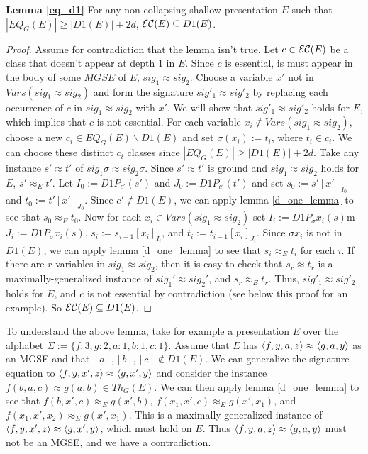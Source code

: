 \noindent \textbf{Lemma \ref{eq_d1}} For any non-collapsing shallow presentation $E$ such that $|EQ_G(E)| \ge |D1(E)| + 2d$, ${\mathcal{E}\mathcal{C}}(E) \subseteq D1(E)$.
\begin{proof}
Assume for contradiction that the lemma isn't true. 
Let $c \in {\mathcal{E}\mathcal{C}}(E)$ be a class that doesn't appear at depth 1 in $E$.
Since $c$ is essential, is must appear in the body of some $MGSE$ of $E$, $sig_1 \approx sig_2$.
Choose a variable $x'$ not in $Vars(sig_1 \approx sig_2)$ and form the signature $sig'_1 \approx sig'_2$ by replacing each occurrence of $c$ in $sig_1 \approx sig_2$ with $x'$.
We will show that $sig'_1 \approx sig'_2$ holds for $E$, which implies that $c$ is not essential.
For each variable $x_i \not \in Vars(sig_1\approx sig_2)$, choose a new $c_i \in EQ_G(E) \backslash D1(E)$ and set $\sigma(x_i) := t_i$, where $t_i \in c_i$.
We can choose these distinct $c_i$ classes since $|EQ_G(E)| \ge |D1(E)| + 2d$.
Take any instance $s' \approx t'$ of $sig_1\sigma\approx sig_2\sigma$.  
Since $s'\approx t'$ is ground and $sig_1 \approx sig_2$ holds for $E$, $s'\approx_E t'$.
Let $I_0 := D1P_{c'}(s')$ and $J_0 := D1P_{c'}(t')$ and set $s_0 := s'[x']_{I_0}$ and $t_0 := t'[x']_{J_0}$.
Since $c' \not\in D1(E)$, we can apply lemma \ref{d_one_lemma} to see that $s_0 \approx_E t_0$. 
Now for each $x_i \in Vars(sig_1 \approx sig_2)$ set $I_i := D1P_\sigma x_i (s)$m $J_i := D1P_\sigma x_i (s)$, $s_i := s_{i-1}[x_i]_{I_i}$, and $t_i := t_{i-1}[x_i]_{J_i}$.
Since $\sigma x_i$ is not in $D1(E)$, we can apply lemma \ref{d_one_lemma} to see that $s_i \approx_E t_i$ for each $i$. 
If there are $r$ variables in $sig_1 \approx sig_2$, then it is easy to check that $s_r \approx t_r$ is a maximally-generalized instance of $sig_1' \approx sig_2'$, and $s_r \approx_E t_r$. 
Thus, $sig'_1 \approx sig'_2$ holds for $E$, and $c$ is not essential by contradiction (see below this proof for an example).
So ${\mathcal{E}\mathcal{C}}(E) \subseteq D1(E)$.
\end{proof}

To understand the above lemma, take for example a presentation $E$ over the alphabet $\Sigma := \{ f:3, g:2, a:1, b:1, c:1 \}$.
Assume that $E$ has $\langle f,y,a,z \rangle\approx\langle g,a,y \rangle$ as an MGSE and that $[a],[b],[c] \not\in D1(E)$. 
We can generalize the signature equation to $\langle f,y,x',z \rangle\approx\langle g,x',y \rangle$ and consider the instance $f(b,a,c)\approx g(a,b) \in Th_G(E)$.
We can then apply lemma \ref{d_one_lemma} to see that $f(b,x',c) \approx _E g(x',b)$, $f(x_1,x',c) \approx _E g(x',x_1)$, and $f(x_1,x',x_2) \approx _E g(x',x_1)$.
This is a maximally-generalized instance of $\langle f,y,x',z \rangle\approx \langle g,x',y \rangle$, which must hold on $E$. 
Thus $\langle f,y,a,z \rangle\approx \langle g,a,y \rangle$ must not be an MGSE, and we have a contradiction.\\\\



